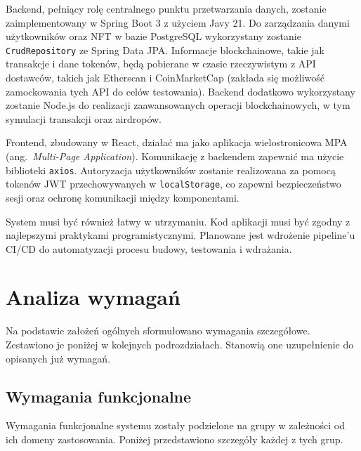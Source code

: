 Backend, pełniący rolę centralnego punktu przetwarzania danych, zostanie zaimplementowany w Spring Boot 3 z użyciem Javy 21. Do zarządzania danymi użytkowników oraz NFT w bazie PostgreSQL wykorzystany zostanie \texttt{CrudRepository} ze Spring Data JPA. Informacje blockchainowe, takie jak transakcje i dane tokenów, będą pobierane w czasie rzeczywistym z API dostawców, takich jak Etherscan i CoinMarketCap (zakłada się możliwość zamockowania tych API do celów testowania). Backend dodatkowo wykorzystany zostanie Node.js do realizacji zaawansowanych operacji blockchainowych, w tym symulacji transakcji oraz airdropów.

Frontend, zbudowany w React, działać ma jako aplikacja wielostronicowa MPA (ang.~\emph{Multi-Page Application}). Komunikację z backendem zapewnić ma użycie biblioteki \texttt{axios}. Autoryzacja użytkowników zostanie realizowana za pomocą tokenów JWT przechowywanych w \texttt{localStorage}, co zapewni bezpieczeństwo sesji oraz ochronę komunikacji między komponentami.

System musi być również łatwy w utrzymaniu. Kod aplikacji musi być zgodny z najlepszymi praktykami programistycznymi. Planowane jest wdrożenie pipeline’u CI/CD do automatyzacji procesu budowy, testowania i wdrażania.




\section{Analiza wymagań}
Na podstawie założeń ogólnych sformułowano wymagania szczegółowe. Zestawiono je poniżej w kolejnych podrozdziałach. Stanowią one uzupełnienie do opisanych już wymagań. 
\subsection{Wymagania funkcjonalne}
Wymagania funkcjonalne systemu zostały podzielone na grupy w zależności od ich domeny zastosowania. Poniżej przedstawiono szczegóły każdej z tych grup.

